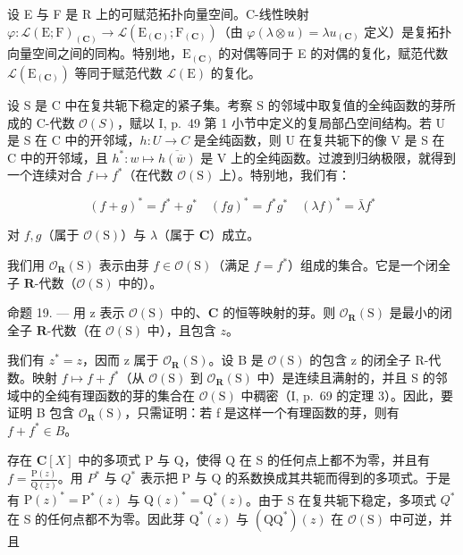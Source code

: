 设 E 与 F 是 R 上的可赋范拓扑向量空间。C-线性映射 \(\varphi\colon\mathcal{L}(\mathrm{E};\mathrm{F})_{(\mathbf{C})}\to\mathcal{L}(\mathrm{E}_{(\mathbf{C})};\mathrm{F}_{(\mathbf{C})})\)（由 \(\varphi(\lambda\otimes u)=\lambda u_{(\mathbf{C})}\) 定义）是复拓扑向量空间之间的同构。特别地，\(\mathrm{E}_{(\mathbf{C})}\) 的对偶等同于 E 的对偶的复化，赋范代数 \(\mathcal{L}(\mathrm{E}_{(\mathbf{C})})\) 等同于赋范代数 \(\mathcal{L}(\mathrm{E})\) 的复化。

设 S 是 C 中在复共轭下稳定的紧子集。考察 S 的邻域中取复值的全纯函数的芽所成的 C-代数 \(\mathcal{O}(S)\)，赋以 I, p.~49 第 1 小节中定义的复局部凸空间结构。若 U 是 S 在 C 中的开邻域，\(h: U \to C\) 是全纯函数，则 U 在复共轭下的像 V 是 S 在 C 中的开邻域，且 \(h^{*}: w \mapsto \overline{h(\overline{w})}\) 是 V 上的全纯函数。过渡到归纳极限，就得到一个连续对合 \(f\mapsto f^{*}\)（在代数 \(\mathcal{O}(\mathrm{S})\) 上）。特别地，我们有：

\[
(f + g) ^ {*} = f ^ {*} + g ^ {*} \quad (f g) ^ {*} = f ^ {*} g ^ {*} \quad (\lambda f) ^ {*} = \bar {\lambda} f ^ {*}
\]

对 \(f,g\)（属于 \(\mathcal{O}(\mathrm{S})\)）与 \(\lambda\)（属于 \(\mathbf{C}\)）成立。

我们用 \(\mathcal{O}_{\mathbf{R}}(\mathrm{S})\) 表示由芽 \(f \in \mathcal{O}(\mathrm{S})\)（满足 \(f = f^{*}\)）组成的集合。它是一个闭全子 \(\mathbf{R}\)-代数（\(\mathcal{O}(\mathrm{S})\) 中的）。

命题 19. --- 用 z 表示 \(\mathcal{O}(\mathrm{S})\) 中的、\(\mathbf{C}\) 的恒等映射的芽。则 \(\mathcal{O}_{\mathbf{R}}(\mathrm{S})\) 是最小的闭全子 \(\mathbf{R}\)-代数（在 \(\mathcal{O}(\mathrm{S})\) 中），且包含 \(z\)。

我们有 \(z^{*} = z\)，因而 z 属于 \(\mathcal{O}_{\mathbf{R}}(\mathrm{S})\)。设 B 是 \(\mathcal{O}(\mathrm{S})\) 的包含 z 的闭全子 R-代数。映射 \(f \mapsto f + f^{*}\)（从 \(\mathcal{O}(\mathrm{S})\) 到 \(\mathcal{O}_{\mathbf{R}}(\mathrm{S})\) 中）是连续且满射的，并且 S 的邻域中的全纯有理函数的芽的集合在 \(\mathcal{O}(\mathrm{S})\) 中稠密（I, p.~69 的定理 3）。因此，要证明 B 包含 \(\mathcal{O}_{\mathbf{R}}(\mathrm{S})\)，只需证明：若 f 是这样一个有理函数的芽，则有 \(f + f^{*} \in B\)。

存在 \(\mathbf{C}[X]\) 中的多项式 P 与 Q，使得 Q 在 S 的任何点上都不为零，并且有 \(f = \frac{\mathrm{P}(z)}{\mathrm{Q}(z)}\)。用 \(P^{*}\) 与 \(Q^{*}\) 表示把 P 与 Q 的系数换成其共轭而得到的多项式。于是有 \(\mathrm{P}(z)^{*} = \mathrm{P}^{*}(z)\) 与 \(\mathrm{Q}(z)^{*} = \mathrm{Q}^{*}(z)\)。由于 S 在复共轭下稳定，多项式 \(Q^{*}\) 在 S 的任何点都不为零。因此芽 \(\mathrm{Q}^{*}(z)\) 与 \((\mathrm{QQ}^{*})(z)\) 在 \(\mathcal{O}(\mathrm{S})\) 中可逆，并且

